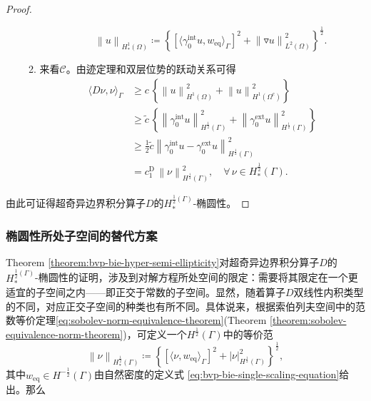 \begin{proof}
\begin{enumerate}
\begin{enumerate}
\begin{enumerate}
    \begin{equation*}
      \left\| u \right\|_{H_{*}^{1}(\Omega)}
      \coloneqq \left\{
      \left[
      \langle
      \gamma_{0}^{\text{int}} u, w_{\text{eq}}
      \rangle_{\Gamma}
      \right]^{2}
      + \left\|
      \triangledown u \right\|_{L^{2}(\Omega)}^{2}
      \right\}^{\frac{1}{2}}.
    \end{equation*}
      \end{enumerate}
    \item 来看$\mathcal{C}$。由迹定理和双层位势的跃动关系可得
    \begin{equation*}
      \begin{split}
        \langle D \nu, \nu \rangle_{\Gamma} & \ge
        c \, \left\{
        \left\| u \right\|_{H^{1}(\Omega)}^{2} +
        \left\| u \right\|_{H^{1}(\Omega^{c})}^{2}
        \right\}\\
        & \ge \widetilde{c} \,
        \left\{
        \left\| \gamma_{0}^{\text{int}} u \right\|_{H^{\frac{1}{2}}(\Gamma)}^{2}
        + \left\| \gamma_{0}^{\text{ext}} u \right\|_{H^{\frac{1}{2}}(\Gamma)}^{2}
        \right\} \\
        & \ge
        \frac{1}{2} \widetilde{c}
        \left\|
        \gamma_{0}^{\text{int}} u
        - \gamma_{0}^{\text{ext}} u
        \right\|_{H^{\frac{1}{2}}(\Gamma)}^{2} \\
        & = c_{1}^{\text{D}} \,
        \left\| \nu \right\|_{H^{\frac{1}{2}}(\Gamma)}^{2}, \quad \forall \, \nu \in H_{*}^{\frac{1}{2}}(\Gamma).
      \end{split}
    \end{equation*}
\end{enumerate}
\end{enumerate}
由此可证得超奇异边界积分算子$D$的$H_{*}^{\frac{1}{2} (\Gamma)}$-椭圆性。
\end{proof}

\subsubsection{椭圆性所处子空间的替代方案}
Theorem \ref{theorem:bvp-bie-hyper-semi-ellipticity}对超奇异边界积分算子$D$的$H_{*}^{\frac{1}{2} (\Gamma)}$-椭圆性的证明，涉及到对解方程所处空间的限定：需要将其限定在一个更适宜的子空间之内——即正交于常数的子空间。显然，随着算子$D$双线性内积类型的不同，对应正交子空间的种类也有所不同。具体说来，根据索伯列夫空间中的范数等价定理\eqref{eq:sobolev-norm-equivalence-theorem}(Theorem \ref{theorem:sobolev-equivalence-norm-theorem})，可定义一个$H^{\frac{1}{2}}(\Gamma)$中的等价范
\begin{equation*}
  \left\| \nu \right\|_{H_{*}^{\frac{1}{2}}(\Gamma)}
  \coloneqq
  \left\{
  \left[
  \langle \nu, w_{\text{eq}} \rangle_{\Gamma}
  \right]^{2}
  + \left| \nu \right|_{H^{\frac{1}{2}}(\Gamma)}^{2}
  \right\}^{\frac{1}{2}},
\end{equation*}
其中$w_{\text{eq}} \in H^{-\frac{1}{2}}(\Gamma)$由自然密度的定义式  \eqref{eq:bvp-bie-single-scaling-equation}给出。那么

